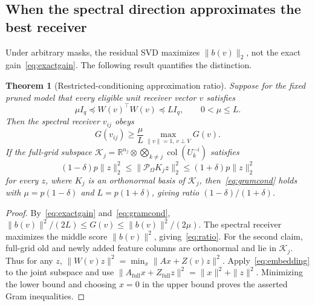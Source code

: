 \documentclass[review,10pt]{elsarticle}
\newtheorem{theorem}{Theorem}
\newcommand{\R}{\mathbb R}
\begin{document}
\subsection{When the spectral direction approximates the best receiver}\label{subsec:screenquality}
Under arbitrary masks, the residual SVD maximizes $\|b(v)\|_2$, not the exact gain~\eqref{eq:exactgain}. The following result quantifies the distinction.
\begin{theorem}[Restricted-conditioning approximation ratio]\label{thm:ratio}
Suppose for the fixed pruned model that every eligible unit receiver vector $v$ satisfies
\begin{equation}\label{eq:gramcond}
\mu I_q\preceq W(v)^\top W(v)\preceq L I_q,
\qquad0<\mu\le L.
\end{equation}
Then the spectral receiver $v_{ij}$ obeys
\begin{equation}\label{eq:ratio}
G(v_{ij})\ge\frac{\mu}{L}\max_{\|v\|=1,\,v\perp V}G(v).
\end{equation}
If the full-grid subspace $\mathcal K_j=\R^{n_j}\otimes\bigotimes_{k\ne j}\operatorname{col}(U_k^{-i})$ satisfies
\begin{equation}\label{eq:embedding}
(1-\delta)p\|z\|_2^2\le\|\mathcal P_\Omega K_jz\|_2^2\le(1+\delta)p\|z\|_2^2
\end{equation}
for every $z$, where $K_j$ is an orthonormal basis of $\mathcal K_j$, then~\eqref{eq:gramcond} holds with $\mu=p(1-\delta)$ and $L=p(1+\delta)$, giving ratio $(1-\delta)/(1+\delta)$.
\end{theorem}
\begin{proof}
By~\eqref{eq:exactgain} and~\eqref{eq:gramcond}, $\|b(v)\|^2/(2L)\le G(v)\le\|b(v)\|^2/(2\mu)$. The spectral receiver maximizes the middle score $\|b(v)\|^2$, giving~\eqref{eq:ratio}. For the second claim, full-grid old and newly added feature columns are orthonormal and lie in $\mathcal K_j$. Thus for any $z$, $\|W(v)z\|^2=\min_x\|A x+Z(v)z\|^2$. Apply~\eqref{eq:embedding} to the joint subspace and use $\|A_{\mathrm{full}}x+Z_{\mathrm{full}}z\|^2=\|x\|^2+\|z\|^2$. Minimizing the lower bound and choosing $x=0$ in the upper bound proves the asserted Gram inequalities.\end{proof}
\end{document}
